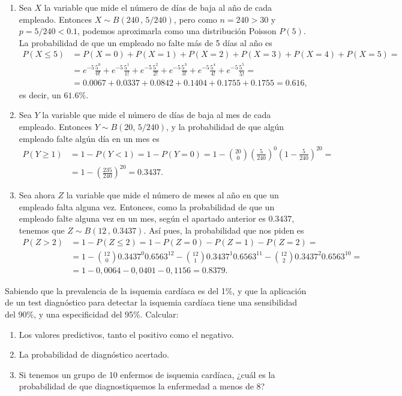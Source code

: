 {
\begin{enumerate}
\item Sea $X$ la variable que mide el número de días de baja al año de cada empleado. Entonces \mbox{$X\sim B(240\,,\,5/240)$}, pero como
$n=240>30$ y $p=5/240<0.1$, podemos aproximarla como una distribución Poisson $P(5)$. La probabilidad de que un empleado no falte más de 5
días al año es
\begin{align*}
P(X\leq 5)&= P(X=0)+P(X=1)+P(X=2)+P(X=3)+P(X=4)+P(X=5)= \\
&= e^{-5}\frac{5^0}{0!}+
e^{-5}\frac{5^1}{1!}+e^{-5}\frac{5^2}{2!}+e^{-5}\frac{5^3}{3!}
+e^{-5}\frac{5^4}{4!}+e^{-5}\frac{5^5}{5!}= \\
&= 0.0067+0.0337+0.0842+0.1404+0.1755+0.1755=0.616,
\end{align*}
es decir, un $61.6\%$.

\item Sea $Y$ la variable que mide el número de días de baja al mes de cada empleado. Entonces \mbox{$Y\sim B(20,\,5/240)$}, y la
probabilidad de que algún empleado falte algún día en un mes es
\begin{align*}
P(Y\geq1)&=1-P(Y<1)=1-P(Y=0)=
1-\binom{20}{0}\left(\frac{5}{240}\right)^0\left(1-\frac{5}{240}\right)^{20}= \\
&=1-\left(\frac{235}{240}\right)^{20}=0.3437.
\end{align*}

\item Sea ahora $Z$ la variable que mide el número de meses al año en que un empleado falta alguna vez. Entonces, como la probabilidad de
que un empleado falte alguna vez en un mes, según el apartado anterior es $0.3437$, tenemos que $Z\sim B(12\,,\,0.3437)$. Así pues, la
probabilidad que nos piden  es
\begin{align*}
P(Z>2)&=1-P(Z\leq 2)=1-P(Z=0)-P(Z=1)-P(Z=2)=\\
&= 1-\binom{12}{0}0.3437^0 0.6563^{12}-\binom{12}{1}0.3437^1 0.6563^{11}-
\binom{12}{2}0.3437^2 0.6563^{10}=\\
&=1-0,0064-0,0401-0,1156=0.8379.
\end{align*}
\end{enumerate}
}


{Sabiendo que la prevalencia de la isquemia cardíaca es del 1\%, y que la aplicación de un test diagnóstico para detectar la isquemia
cardíaca tiene una sensibilidad del 90\%, y una especificidad del 95\%. Calcular:
\begin{enumerate}
\item Los valores predictivos, tanto el positivo como el negativo.
\item La probabilidad de diagnóstico acertado.
\item Si tenemos un grupo de 10 enfermos de isquemia cardíaca, ¿cuál es la probabilidad de que diagnostiquemos la enfermedad a
menos de 8?
\end{enumerate}
} 
{
}
{
}


